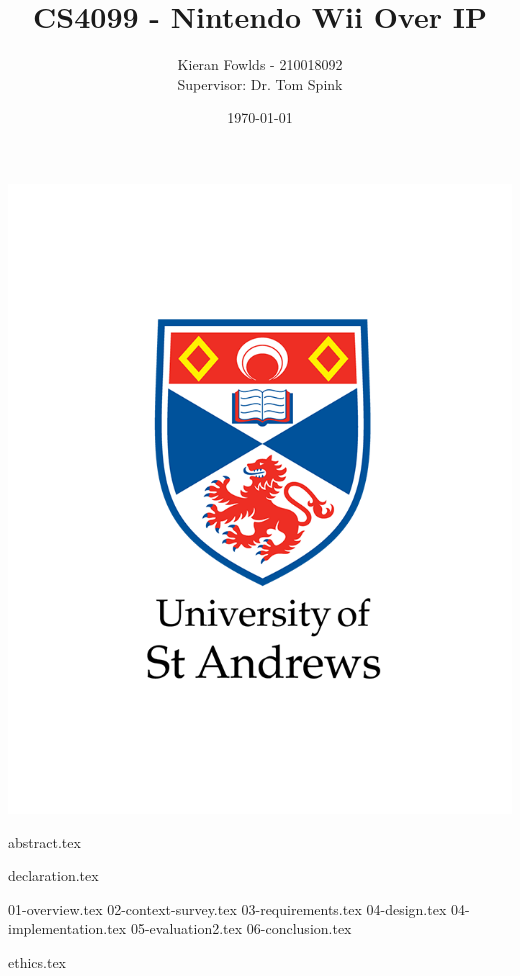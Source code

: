 \documentclass[12pt,abstract=true,headings=standardclasses,titlepage=false]{scrreprt}
\title{CS4099 - Nintendo Wii Over IP}
\author{Kieran Fowlds - 210018092 \\
Supervisor: Dr. Tom Spink}
\date{\today}
\begin{document}
\maketitle
\thispagestyle{empty}
\vfill
\begin{center}
	\includegraphics[width=0.6\linewidth]{figures/logo.png}
\end{center}

\newpage
{abstract.tex}
\thispagestyle{empty}
\clearpage


\newpage
{declaration.tex}
\thispagestyle{empty}
\clearpage

\newpage
\setcounter{page}{1}

\tableofcontents
\clearpage
{}
\setcounter{page}{1}

{01-overview.tex}
{02-context-survey.tex}
{03-requirements.tex}
{04-design.tex}
{04-implementation.tex}
{05-evaluation2.tex}
{06-conclusion.tex}

\printbibliography[title=References]

\appendix
\clearpage
\renewcommand{\thepage}{}
{ethics.tex}
\end{document}

